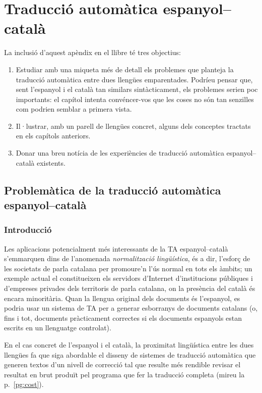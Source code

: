 \chapter{Traducció automàtica espanyol--català}
\label{se:PdTACC}

La inclusió d'aquest apèndix en el llibre té tres objectius:
\begin{enumerate}
\item Estudiar amb una miqueta més de detall els problemes que
  planteja la traducció automàtica entre dues llengües
  emparentades. Podríeu pensar que, sent l'espanyol i el català tan
  similars sintàcticament, els problemes serien poc importants: el
  capítol intenta convéncer-vos que les coses no són tan senzilles com
  podrien semblar a primera vista.
\item Il·lustrar, amb un parell de llengües concret, alguns dels
  conceptes tractats en els capítols anteriors.
\item Donar una breu notícia de les experiències de traducció
  automàtica espanyol--català existents.
\end{enumerate}



\section{Problemàtica de la traducció automàtica espanyol--català}

\subsection{Introducció}

Les aplicacions potencialment més interessants de la TA
espanyol--català s'em\-mar\-quen dins de l'anomenada {\em
  normalització lingüística}, és a dir, l'esforç de les societats de
parla catalana per promoure'n l'ús normal en tots els àmbits; un
exemple actual el constitueixen els servidors d'Internet
d'institucions públiques i d'empreses privades dels territoris de
parla catalana, on la presència del català és encara minoritària. Quan
la llengua original dels documents és l'espanyol, es podria usar un
sistema de TA per a generar esborranys de documents catalans (o, fins
i tot, documents pràcticament correctes si els documents espanyols
estan escrits en un llenguatge controlat).

En el cas concret de l'espanyol i el català, la proximitat lingüística
entre les dues llengües fa que siga abordable el disseny de sistemes
de traducció automàtica que generen textos d'un nivell de correcció
tal que resulte més rendible revisar el resultat en brut produït pel
programa que fer la traducció completa (mireu la p.~\ref{pg:cost}).


